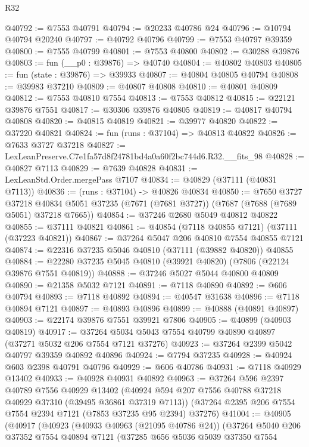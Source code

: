 \begin{lexlean}{R32}
\begin{coremodule}
@40792 := @7553 @40791
@40794 := @20233 @40786 @24
@40796 := @10794 @40794 @20240
@40797 := @40792 @40796
@40799 := @7553 @40797 @39359
@40800 := @7555 @40799
@40801 := @7553 @40800
@40802 := @30288 @39876
@40803 := fun (__p0 : @39876) => @40740
@40804 := @40802 @40803
@40805 := fun (state : @39876) => @39933
@40807 := @40804 @40805 @40794
@40808 := @39983 @37210
@40809 := @40807 @40808
@40810 := @40801 @40809
@40812 := @7553 @40810 @7554
@40813 := @7553 @40812
@40815 := @22121 @39876 @7551
@40817 := @30306 @39876 @40805
@40819 := @40817 @40794 @40808
@40820 := @40815 @40819
@40821 := @39977 @40820
@40822 := @37220 @40821
@40824 := fun (runs : @37104) => @40813 @40822
@40826 := @7633 @3727 @37218
@40827 := LexLeanPreserve.C7e1fa57d8f24781bd4a0a60f2bc744d6.R32.__fits_98
@40828 := @40827 @7113
@40829 := @7639 @40828
@40831 := LexLeanStd.Order.mergePass @7107
@40834 := @40829 (@37111 (@40831 @7113))
@40836 := (runs : @37104) -> @40826 @40834
@40850 := @7650
    @3727
    @37218
    @40834
    @5051
    @37235
    (@7671 (@7681 @3727))
    (@7687 (@7688 (@7689 @5051) @37218 @7665))
@40854 := @37246 @2680 @5049 @40812 @40822
@40855 := @37111 @40821
@40861 := @40854 (@7118 @40855 @7121) (@37111 (@37223 @40821))
@40867 := @37264 @5047 @206 @40810 @7554 @40855 @7121
@40874 := @22316 @37235 @5046 @40810 (@37111 (@39882 @40820)) @40855
@40884 := @22280 @37235 @5045 @40810 (@39921 @40820) (@7806 (@22124 @39876 @7551 @40819))
@40888 := @37246 @5027 @5044 @40800 @40809
@40890 := @21358 @5032 @7121
@40891 := @7118 @40890
@40892 := @606 @40794
@40893 := @7118 @40892
@40894 := @40547 @31638
@40896 := @7118 @40894 @7121
@40897 := @40893 @40896
@40899 := @40888 (@40891 @40897)
@40903 := @22174 @39876 @7551 @39921 @7806
@40905 := @40899 (@40903 @40819)
@40917 := @37264 @5034 @5043 @7554 @40799 @40890 @40897 (@37271 @5032 @206 @7554 @7121 @37276)
@40923 := @37264 @2399 @5042 @40797 @39359 @40892 @40896
@40924 := @7794 @37235
@40928 := @40924 @603 @2398 @40791 @40796
@40929 := @606 @40786
@40931 := @7118 @40929 @13402
@40933 := @40928 @40931 @40892
@40963 := @37264
    @596
    @2397
    @40789
    @7556
    @40929
    @13402
    (@40924 @594 @207 @7556 @40788 @37218 @40929 @37310 (@39495 @36861 @37319 @7113))
    (@37264 @2395 @206 @7554 @7554 @2394 @7121 (@7853 @37235 @95 @2394) @37276)
@41004 := @40905
    (@40917
      (@40923
        (@40933 @40963 (@21095 @40786 @24))
        (@37264
          @5040
          @206
          @37352
          @7554
          @40894
          @7121
          (@37285
            @656
            @5036
            @5039
            @37350
            @7554

\end{coremodule}
\end{lexlean}
